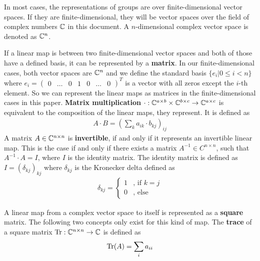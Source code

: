 In most cases, the representations of groups are over finite-dimensional vector spaces.
If they are finite-dimensional, they will be vector spaces over the field of complex numbers $\mathbb{C}$ in this document.
A $n$-dimensional complex vector space is denoted as $\mathbb{C}^n$.

If a linear map is between two finite-dimensional vector spaces and both of those have a defined basis, it can be represented by a \textbf{matrix}.
In our finite-dimensional cases, both vector spaces are $\mathbb{C}^n$ and we define the standard basis $\{e_i | 0 \leq i < n\}$ where $e_i = \begin{pmatrix} 0 & \ldots & 0 & 1 & 0 & \ldots & 0 \end{pmatrix}^T$ is a vector with all zeros except the $i$-th element.
So we can represent the linear maps as matrices in the finite-dimensional cases in this paper.
\textbf{Matrix multiplication} $\cdot: \mathbb{C}^{a \times b} \times \mathbb{C}^{b \times c} \to \mathbb{C}^{a \times c}$ is equivalent to the composition of the linear maps, they represent.
It is defined as
\begin{align}
    A \cdot B = \left(\sum_k a_{ik} \cdot b_{kj}\right)_{ij}
\end{align}
A matrix $A \in \mathbb{C}^{n \times n}$ is \textbf{invertible}, if and only if it represents an invertible linear map.
This is the case if and only if there exists a matrix $A^{-1} \in C^{n \times n}$, such that $A^{-1} \cdot A = I$, where $I$ is the identity matrix. 
The identity matrix is defined as $I = (\delta_{kj})_{kj}$ where $\delta_{kj}$ is the Kronecker delta defined as
\begin{align}
    \delta_{kj} = \begin{cases}
        1 & \text{, if } k = j \\
        0 & \text{, else}
    \end{cases}
\end{align}

A linear map from a complex vector space to itself is represented as a \textbf{square} matrix.
The following two concepts only exist for this kind of map.
The \textbf{trace} of a square matrix $\operatorname{Tr}: \mathbb{C}^{n \times n} \to \mathbb{C}$ is defined as
\begin{align}
    \operatorname{Tr}(A) = \sum_i a_{ii}
\end{align}


